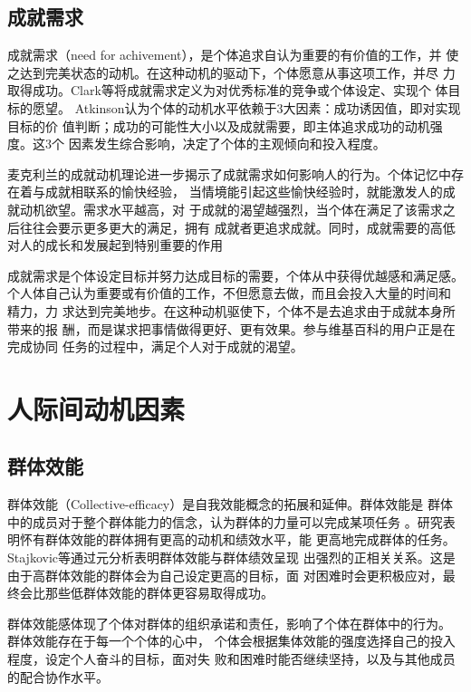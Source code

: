 \subsection{成就需求}
\label{sec:achievement}
成就需求（need for achivement），是个体追求自认为重要的有价值的工作，并
使之达到完美状态的动机。在这种动机的驱动下，个体愿意从事这项工作，并尽
力取得成功。Clark等将成就需求定义为对优秀标准的竞争或个体设定、实现个
体目标的愿望\cite{clark1956hope}。
Atkinson认为个体的动机水平依赖于3大因素：成功诱因值，即对实现目标的价
值判断；成功的可能性大小以及成就需要，即主体追求成功的动机强度。这3个
因素发生综合影响，决定了个体的主观倾向和投入程度\cite{atkinson1953achievement}。

麦克利兰的成就动机理论进一步揭示了成就需求如何影响人的行为。个体记忆中存在着与成就相联系的愉快经验，
当情境能引起这些愉快经验时，就能激发人的成就动机欲望。需求水平越高，对
于成就的渴望越强烈，当个体在满足了该需求之后往往会要示更多更大的满足，拥有
成就者更追求成就\cite{mcclelland1976am}。同时，成就需要的高低对人的成长和发展起到特别重要的作用

成就需求是个体设定目标并努力达成目标的需要，个体从中获得优越感和满足感。
个人体自己认为重要或有价值的工作，不但愿意去做，而且会投入大量的时间和
精力，力
求达到完美地步。在这种动机驱使下，个体不是去追求由于成就本身所带来的报
酬，而是谋求把事情做得更好、更有效果。参与维基百科的用户正是在完成协同
任务的过程中，满足个人对于成就的渴望。



\section{人际间动机因素}
\label{sec:groupe-motivation}

\subsection{群体效能}
\label{sec:collective-efficacy}

群体效能（Collective-efficacy）是自我效能概念的拓展和延伸。群体效能是
群体中的成员对于整个群体能力的信念，认为群体的力量可以完成某项任务
\cite{bundura1977slt}。研究表明怀有群体效能的群体拥有更高的动机和绩效水平，能
更高地完成群体的任务。Stajkovic等通过元分析表明群体效能与群体绩效呈现
出强烈的正相关关系。这是由于高群体效能的群体会为自己设定更高的目标，面
对困难时会更积极应对，最终会比那些低群体效能的群体更容易取得成功\cite{stajkovic2009collective}。

群体效能感体现了个体对群体的组织承诺和责任，影响了个体在群体中的行为。
群体效能存在于每一个个体的心中，
个体会根据集体效能的强度选择自己的投入程度，设定个人奋斗的目标，面对失
败和困难时能否继续坚持，以及与其他成员的配合协作水平。

